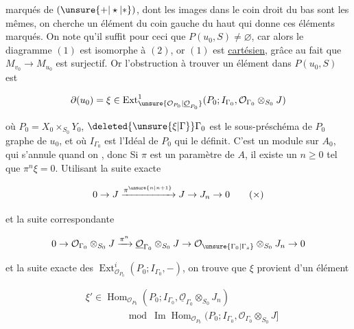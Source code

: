 marqués de $(\unsure{+|\star|\ast})$, dont les images dans le coin droit du bas sont les mêmes, on cherche un élément du coin gauche du haut qui donne ces éléments marqués. On note qu'il suffit pour ceci que $P(u_0,S)\ne\varnothing$, car alors le diagramme $(1)$ est isomorphe à $(2)$, or $(1)$ est \uline{cartésien}, grâce au fait que $M_{v_0}\to M_{u_0}$ est surjectif. Or l'obstruction à trouver un élément dans $P(u_0,S)$ est 

\[
\partial(u_0)=\xi\in\operatorname{Ext}^{1}_{\unsure{\mathcal O_{P_0}|\underline{\mathcal O}_{P_0}}}
(P_0;I_{\Gamma_0},\mathcal O_{\Gamma_0}\otimes_{S_0}J)
\]



où $P_0=X_0\times_{S_0}Y_0$, $\deleted{\unsure{\xi|\Gamma}}\Gamma_0$ est le sous-préschéma de $P_0$ graphe de $u_0$, et où $I_{\Gamma_0}$ est l'Idéal de $P_0$ qui le définit. C'est un module sur $A_0$, qui s'annule quand on , donc Si $\pi$ est un paramètre de $A$, il existe un $n\geq 0$ tel que $\pi^n\xi=0$. Utilisant la suite exacte

\[
0\to J\xrightarrow{\pi^{\unsure{n|n+1}}}J\to J_n\to 0 \tag*{$(\times)$}
\]

et la suite correspondante

\[
0\to\mathcal O_{\Gamma_0}\otimes_{S_0}J\xrightarrow{\pi^n}\underline{\mathcal O}_{\Gamma_0}\otimes_{S_0}J\to\mathcal O_{\unsure{\Gamma_0|\Gamma_s}}\otimes_{S_0}J_n\to0
\]

et la suite exacte des $\operatorname{Ext}^{i}_{\mathcal O_{P_0}}(P_0;I_{\Gamma_0},-)$, on trouve que $\xi$ provient d'un élément

\[
\begin{aligned}
&\xi'\in\operatorname{Hom}_{\mathcal O_{P_0}}(P_0;I_{\Gamma_0},\underline{\mathcal O}_{\Gamma_0}\otimes_{S_0}J_n)\\
&\hspace{4em}\bmod\operatorname{Im}\operatorname{Hom}_{\mathcal O_{P_0}}(P_0;I_{\Gamma_0},\mathcal O_{\Gamma_0}\otimes_{S_0}J]
\end{aligned}
\]


